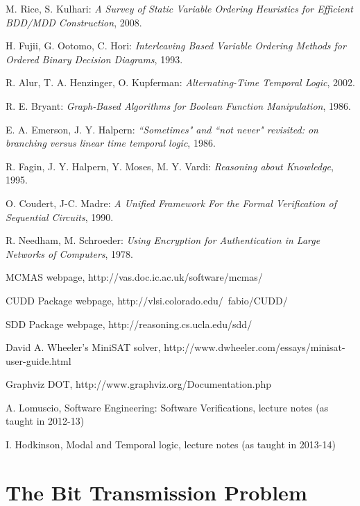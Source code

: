 \documentclass[11pt]{report}
\begin{document}
\begin{thebibliography}{9}
 M. Rice, S. Kulhari:\textit{ A Survey of Static Variable Ordering Heuristics for Efficient BDD/MDD Construction}, 2008.

 H. Fujii, G. Ootomo, C. Hori: \textit{Interleaving Based Variable Ordering Methods for Ordered Binary Decision Diagrams}, 1993.

 R. Alur, T. A. Henzinger, O. Kupferman: \textit{Alternating-Time Temporal Logic}, 2002.

 R. E. Bryant: \textit{Graph-Based Algorithms
for Boolean Function Manipulation}, 1986.

  	E. A. Emerson, J. Y. Halpern:\textit{
``Sometimes" and ``not never" revisited: on branching versus linear time temporal logic}, 1986.
	
R. Fagin, J. Y. Halpern, Y. Moses, M. Y. Vardi: \textit{Reasoning about Knowledge}, 1995.

 O. Coudert, J-C. Madre: \textit{A Unified Framework For the Formal Verification of Sequential Circuits}, 1990.

 R. Needham, M. Schroeder: \textit{Using Encryption for Authentication in Large Networks of Computers}, 1978.

 MCMAS webpage, http://vas.doc.ic.ac.uk/software/mcmas/

 CUDD Package webpage, http://vlsi.colorado.edu/~fabio/CUDD/

 SDD Package webpage, http://reasoning.cs.ucla.edu/sdd/

 David A. Wheeler's MiniSAT solver,  http://www.dwheeler.com/essays/minisat-user-guide.html

Graphviz DOT, http://www.graphviz.org/Documentation.php

 A. Lomuscio, Software Engineering: Software Verifications, lecture notes (as taught in 2012-13)

 I. Hodkinson, Modal and Temporal logic, lecture notes (as taught in 2013-14)

\end{thebibliography}

\appendix

\chapter{The Bit Transmission Problem}
\label{BTP}
{\centering
{} }
\end{document}
